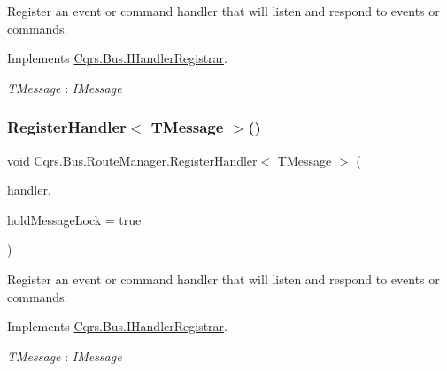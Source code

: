 Register an event or command handler that will listen and respond to events or commands. 



Implements \hyperlink{interfaceCqrs_1_1Bus_1_1IHandlerRegistrar_ab6ca4dfdc54a5aeebe4651dbdb479f55_ab6ca4dfdc54a5aeebe4651dbdb479f55}{Cqrs.\+Bus.\+I\+Handler\+Registrar}.

\begin{Desc}
\item[Type Constraints]\begin{description}
\item[{\em T\+Message} : {\em I\+Message}]\end{description}
\end{Desc}
\mbox{\label{classCqrs_1_1Bus_1_1RouteManager_aeb620222dd0351a6d3848caf93e29954_aeb620222dd0351a6d3848caf93e29954}} 
\subsubsection{\texorpdfstring{Register\+Handler$<$ T\+Message $>$()}{RegisterHandler< TMessage >()}\hspace{0.1cm}{\footnotesize\ttfamily [2/2]}}
{\footnotesize\ttfamily void Cqrs.\+Bus.\+Route\+Manager.\+Register\+Handler$<$ T\+Message $>$ (\begin{DoxyParamCaption}\item[{Action$<$ T\+Message $>$}]{handler,  }\item[{bool}]{hold\+Message\+Lock = {\ttfamily true} }\end{DoxyParamCaption})}



Register an event or command handler that will listen and respond to events or commands. 



Implements \hyperlink{interfaceCqrs_1_1Bus_1_1IHandlerRegistrar_a07792dcc9a8b272709ff2e2dd336a642_a07792dcc9a8b272709ff2e2dd336a642}{Cqrs.\+Bus.\+I\+Handler\+Registrar}.

\begin{Desc}
\item[Type Constraints]\begin{description}
\item[{\em T\+Message} : {\em I\+Message}]\end{description}
\end{Desc}


